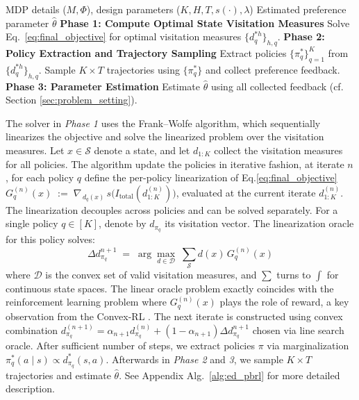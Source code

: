 \documentclass{article}
\newcommand{\mS}{\mathcal{S}}
\begin{document}
\begin{algorithm}[H]
\caption{ED-PBRL (Conceptual Overview)}
\label{alg:ed_pbrl_short}
\begin{algorithmic}
 MDP details ($M, \Phi$), design parameters ($K, H, T, s(\cdot), \lambda$)
 Estimated preference parameter $\hat{\theta}$
\STATE \textbf{Phase 1: Compute Optimal State Visitation Measures}
\STATE \quad Solve Eq.~\ref{eq:final_objective} for optimal visitation measures $\{d^{*h}_q\}_{h,q}$.
\STATE \textbf{Phase 2: Policy Extraction and Trajectory Sampling}
\STATE \quad Extract policies $\{\pi^*_q\}_{q=1}^K$ from $\{d^{*h}_q\}_{h,q}$.
\STATE \quad Sample $K \times T$ trajectories using $\{\pi^*_q\}$ and collect preference feedback.
\STATE \textbf{Phase 3: Parameter Estimation}
\STATE \quad Estimate $\hat{\theta}$ using all collected feedback (cf. Section \ref{sec:problem_setting}).
\end{algorithmic}
\end{algorithm}
\vspace{-0.5cm} %
The solver in \emph{Phase 1} uses the Frank--Wolfe algorithm, which sequentially linearizes the objective and solve the linearized problem over the visitation measures. Let $x \in \mS$ denote a state, and let $d_{1:K}$ collect the visitation measures for all policies. The algorithm update the policies in iterative fashion, at iterate $n$, for each policy $q$ define the per-policy linearization of Eq.\eqref{eq:final_objective} $G_{q}^{(n)}(x) \;:=\; \nabla_{\, d_{q}(x)}\, s\big(I_{\text{total}}(d_{1:K}^{(n)})\big)$,
evaluated at the current iterate $d_{1:K}^{(n)}$. The linearization decouples across policies and can be solved separately. For a single policy $q\in[K]$, denote by $d_{\pi_q}$ its visitation vector. The linearization oracle for this policy solves:
\[\textstyle \Delta d_{\pi_q}^{n+1} \;=\; \arg\max\limits_{d\in\mathcal{D}}\; \sum_{\mS} d(x)\, G_{q}^{(n)}(x)\]
where $\mathcal{D}$ is the convex set of valid visitation measures, and $\sum$ turns to $\int$ for continuous state spaces. The linear oracle problem exactly coincides with the reinforcement learning problem where $G_q^{(n)}(x)$ plays the role of reward, a key observation from the Convex-RL \citep{hazan2019provably, DBLP:journals/corr/abs-2106-00661}. The next iterate is constructed using convex combination $d^{(n+1)}_{\pi_q} = \alpha_{n+1} d^{(n)}_{\pi_q} + (1-\alpha_{n+1})\Delta d^{n+1}_{\pi_q}$ chosen via line search oracle.  After sufficient number of steps, we extract policies $\pi$ via marginalization $\pi^*_q(a\mid s) \propto d^{*}_{\pi_q}(s,a)$. Afterwards in \emph{Phase 2} and \emph{3}, we sample $K\!\times\!T$ trajectories and estimate $\hat{\theta}$. See Appendix Alg.~\ref{alg:ed_pbrl} for more detailed description. 
\end{document}
